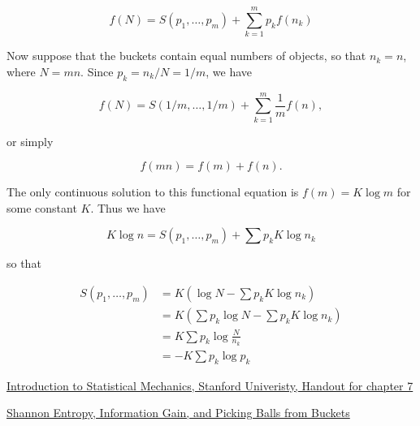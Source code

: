 \begin{equation}
f(N) = S(p_1, \ldots, p_m) + \sum_{k=1}^m p_k f(n_k)
\end{equation}


Now suppose that the buckets contain equal numbers of objects, so that $n_k = n$, where $N = mn$.  Since $p_k = n_k/N = 1/m$, we have

\begin{equation}
f(N) = S(1/m, \ldots, 1/m) + \sum_{k=1}^m \frac{1}{m} f(n),
\end{equation}

or simply


\begin{equation}
f(mn) = f(m) + f(n).
\end{equation}


The only continuous solution to this functional equation is $f(m) = K\log m$
for some constant $K$.  Thus we have

\begin{equation}
K \log n  = S(p_1, \ldots, p_m) + \sum p_k K \log n_k
\end{equation}

so that 

\begin{align}
  S(p_1, \ldots, p_m)            & = K(\log N - \sum p_k K \log n_k) \\
             & = K(\sum p_k \log N - \sum p_k K \log n_k) \\
             & = K \sum p_k \log \frac{N}{n_k} \\
             & = - K \sum p_k \log p_k
\end{align}


 \href{http://micro.stanford.edu/~caiwei/me334/Chap7_Entropy_v04.pdf}{Introduction to Statistical Mechanics, Stanford Univeristy, Handout for chapter 7}

\href{https://medium.com/udacity/shannon-entropy-information-gain-and-picking-balls-from-buckets-5810d35d54b4}{Shannon Entropy, Information Gain, and Picking Balls from Buckets}


